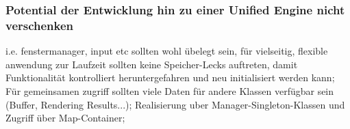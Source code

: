 \subsubsection{Potential der Entwicklung hin zu einer Unified Engine nicht verschenken}
i.e. fenstermanager, input etc sollten wohl übelegt sein, für vielseitig, flexible anwendung zur Laufzeit sollten keine Speicher-Lecks auftreten, damit Funktionalität kontrolliert heruntergefahren und neu initialisiert werden kann; Für gemeinsamen zugriff sollten viele Daten für andere Klassen verfügbar sein (Buffer, Rendering Results...); Realisierung uber Manager-Singleton-Klassen und Zugriff über Map-Container;

